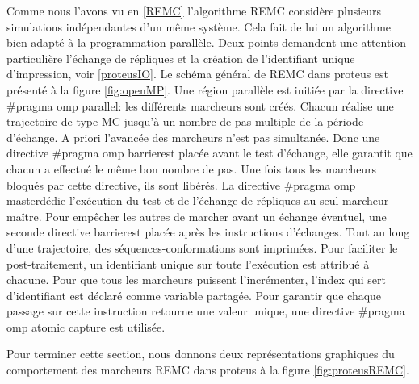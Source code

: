 Comme nous l'avons vu en \ref{REMC} l'algorithme REMC considère plusieurs simulations indépendantes d'un même système. Cela fait de lui un algorithme bien adapté à la programmation parallèle. Deux points demandent une attention particulière l'échange de répliques et la création de l'identifiant unique d'impression, voir \ref{proteusIO}. Le schéma général de REMC dans proteus est présenté à la figure \ref{fig:openMP}. Une région parallèle est initiée par la directive \og #pragma omp parallel\fg: les différents marcheurs sont créés. Chacun réalise une trajectoire de type MC jusqu'à un nombre de pas multiple de la période d'échange. A priori l'avancée des marcheurs n'est pas simultanée. Donc une directive \og #pragma omp barrier\fg est placée avant le test d'échange, elle garantit que chacun a effectué le même bon nombre de pas. Une fois tous les marcheurs bloqués par cette directive, ils sont libérés. La directive \og #pragma omp master\fg dédie l'exécution du test et de l'échange de répliques au seul marcheur maître. Pour empêcher les autres de marcher avant un échange éventuel, une seconde directive \og barrier\fg est placée après les instructions d'échanges. Tout au long d'une trajectoire, des séquences-conformations sont imprimées. Pour faciliter le post-traitement, un identifiant unique sur toute l'exécution est attribué à chacune. Pour que tous les marcheurs puissent l'incrémenter, l'index qui sert d'identifiant est déclaré comme variable partagée. Pour garantir que chaque passage sur cette instruction retourne une valeur unique, une directive \og#pragma omp atomic capture \fg est utilisée.


Pour terminer cette section, nous donnons deux représentations graphiques du comportement des marcheurs REMC dans proteus à la figure \ref{fig:proteusREMC}.  

